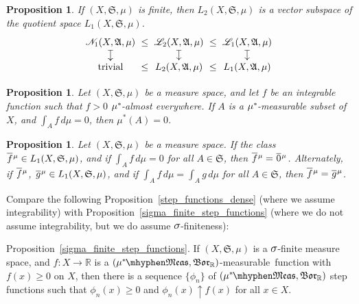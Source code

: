 \documentclass[
twoside=true,
paper=letter,
fontsize=9pt,
pagesize=auto,
leqno,
openany,
headsepline,
overfullrule,
]{scrbook}
\theoremstyle{plain}
\theoremstyle{plain}
\newtheorem{prop}[thm]{Proposition}
\theoremstyle{definition}
\theoremstyle{bfnoteitalic}
\theoremstyle{bfnoteroman}
\newcommand{\sigalg}[1]{\mathfrak{#1}}
\newcommand{\cali}[1]{\mathscr{#1}}
\newcommand{\borel}{\mathfrak{Bor}}
\newcommand{\textsigma}{\hbox{\large{$\sigma$}}\kern-1pt}
\newcommand{\R}{\mathbb{R}}
\newcommand{\semiring}{\sigalg{S}}
\newcommand{\sigmaalgebra}{\sigalg{A}}
\newcommand{\measurable}[1]{{#1}\mhyphen\mathfrak{Meas}}
\newcommand{\kernast}{\ast\kern-1pt}
\newcommand{\mbmeasurable}{$(\measurable{\measure^\kernast},\borel_\R)$\hyp{}measurable}
\newcommand{\measurespace}{X}
\newcommand{\measure}{\mu}
\newcommand*\xbar[1]{%
   \hbox{%
     \vbox{%
       \hrule height 0.4pt %
       \kern0.4ex%
       \hbox{%
         \ensuremath{#1}%
       }%
     }%
   }%
}
\newcommand{\lebclass}[1]{\hspace{.5pt}\xbar{#1}\hspace{0.5pt}}
\newcommand{\ellclass}[2]{\lebclass{#1}^{#2}}
\begin{document}
\begin{prop}
If $(\measurespace, \semiring, \measure)$ is finite, then $L_2(\measurespace, \semiring, \measure)$ is a vector subspace of the quotient space
$L_1(\measurespace, \semiring, \measure)$. 
\[
\xymatrix@R=10pt@C=0pt{ 
\cali{N}_1(\measurespace, \sigmaalgebra, \measure) \ar@{|->}[d] & \leq  & 
\cali{L}_2(\measurespace, \sigmaalgebra, \measure) \ar@{|->}[d] & \leq & 
\cali{L}_1(\measurespace, \sigmaalgebra, \measure) \ar@{|->}[d]\\
\text{trivial} & \leq & 
L_2(\measurespace, \sigmaalgebra, \measure) & \leq &
L_1(\measurespace, \sigmaalgebra, \measure)\\
}
\]
\end{prop}






\begin{prop}\label{null_set_test}
Let $(\measurespace, \semiring, \measure)$ be a measure space, and let $f$ be an integrable function such that $f>0$ $\measure^\kernast$-almost everywhere.  If 
$A$ is a $\measure^\kernast$-measurable subset of $\measurespace$, and $\int_A f\, d\measure=0$, then $\measure^*(A)=0$.
\end{prop}



\begin{prop}\label{equal_function_test}
Let $(\measurespace, \semiring, \measure)$ be a measure space. If the class
$\ellclass{f}{\measure}\in L_1 (\measurespace, \semiring, \measure)$, and if  $\int_A f\, d\measure =0$ for all $A\in \semiring$, then $\ellclass{f}{\measure} = \ellclass{0}{\measure}$. Alternately,  if
$\ellclass{f}{\measure}$, $\ellclass{g}{\measure} \in L_1 (\measurespace, \semiring, \measure)$, and if 
$\int_A f\, d\measure = \int_A g\, d\measure$ for all $A\in \semiring$, then 
$\ellclass{f}{\measure} = \ellclass{g}{\measure}$.
\end{prop}



Compare the following Proposition~\ref{step_functions_dense} (where we assume integrability) with Proposition~\ref{sigma_finite_step_functions} (where we do not assume integrability, but we do assume 
$\textsigma$-finiteness):
\begin{quoting}
\small
Proposition~\ref{sigma_finite_step_functions}.
If $(\measurespace, \semiring, \measure)$ is a $\textsigma$-finite measure space, and $f:\measurespace\to\R$ is a \mbmeasurable\ function with $f(x)\geq 0$ on $\measurespace$, 
then there is a sequence $\{\phi_n\}$ of $(\measurable{\measure^\kernast},\borel_\R)$ step functions such that $\phi_n(x)\geq 0$ and $\phi_n(x)\uparrow f(x)$ for all $x\in\measurespace$.
\end{quoting}
\end{document}
